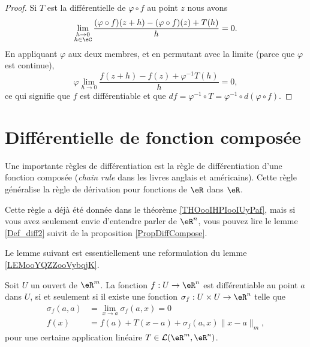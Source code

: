 \begin{proof}
	Si \( T\) est la différentielle de \( \varphi\circ f\) au point \( z\) nous avons
	\begin{equation}
		\lim_{\substack{h\to 0\\h\in \eC}}\frac{ (\varphi\circ f)(z+h)-(\varphi\circ f)(z)+T(h) }{ h }=0.
	\end{equation}
	En appliquant \( \varphi\) aux deux membres, et en permutant avec la limite (parce que \( \varphi\) est continue),
	\begin{equation}
		\varphi\lim_{h\to 0} \frac{ f(z+h)-f(z)+\varphi^{-1} T(h) }{ h }=0,
	\end{equation}
	ce qui signifie que \( f\) est différentiable et que \( df=\varphi^{-1}\circ T=\varphi^{-1}\circ d(\varphi\circ f)\).
\end{proof}

\section{Différentielle de fonction composée}

Une importante règles de différentiation est la règle de différentiation d'une fonction composée (\emph{chain rule} dans les livres anglais et américains). Cette règle généralise la règle de dérivation pour fonctions de $\eR$ dans $\eR$.

Cette règle a déjà été donnée dans le théorème \ref{THOooIHPIooIUyPaf}, mais si vous avez seulement envie d'entendre parler de \( \eR^n\), vous pouvez lire le lemme \ref{Def_diff2} suivit de la proposition \ref{PropDiffCompose}.

Le lemme suivant est essentiellement une reformulation du lemme \ref{LEMooYQZZooVybqjK}.
\begin{lemma}\label{Def_diff2}
	Soit $U$ un ouvert de $\eR^m$. La fonction $f: U\to\eR^n$ est différentiable au point $a$ dans $U$, si et seulement si il existe une fonction $\sigma_f: U\times U\to \eR^n$ telle que
	\begin{subequations}		\label{SubEqsDiff2}
		\begin{align}
			\sigma_f(a,a) & =\lim_{x\to a} \sigma_f(a,x)=0                           \\
			f(x)          & =f(a)+T(x-a)+\sigma_f(a,x)\|x-a\|_m,   \label{def_diff2}
		\end{align}
	\end{subequations}
	pour une certaine application linéaire $T\in\mathcal{L}(\eR^m,\eR^n)$.
\end{lemma}

